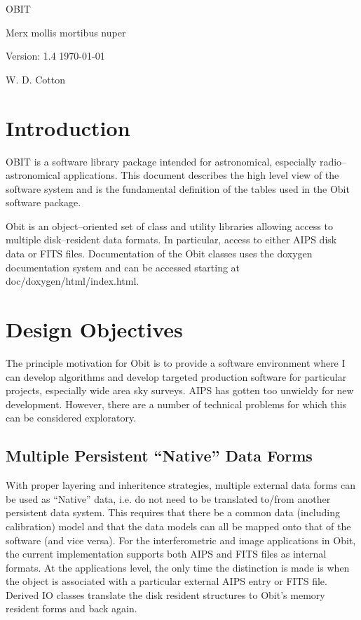 \documentclass[11pt]{article}
\begin{document}
\setcounter{section}{0}

\vskip 5cm
\centerline{\ttlfont OBIT }
\vskip 1cm
\centerline{\ttlfont Merx mollis mortibus nuper}
\vskip 3cm
\centerline{\secfont Version: 1.4 \today}
\vskip 1cm
\centerline{\secfont W. D. Cotton}
\clearpage

\tableofcontents
\cleardoublepage

\section {Introduction}
OBIT is a software library package intended for astronomical,
especially radio--astronomical applications. 
This document describes the high level view of the software system and
is the fundamental definition of the tables  used in the Obit software
package.  

Obit is an object--oriented set of class and utility libraries
allowing access to multiple disk--resident data formats.
In particular, access to either AIPS disk data or FITS files.
Documentation of the Obit classes uses the doxygen documentation
system and can be accessed starting at doc/doxygen/html/index.html.

\section {Design Objectives}
The principle motivation for Obit is to provide a software environment
where I can develop algorithms and develop targeted production
software for particular projects, especially wide area sky surveys.
AIPS has gotten too unwieldy for new development.
However, there are a number of technical problems for which this can be
considered exploratory.

\subsection{Multiple Persistent ``Native'' Data Forms}
With proper layering and inheritence strategies, multiple external data
forms can be used as ``Native'' data, i.e. do not need to be
translated to/from another persistent data system.
This requires that there be a common data (including calibration)
model and that the data models can all be mapped onto that of the
software (and vice versa).
For the interferometric and image applications in Obit, the current
implementation supports both AIPS and FITS files as internal formats.
At the applications level, the only time the distinction is made is
when the object is associated with a particular external AIPS entry or
FITS file.
Derived IO classes translate the disk resident structures to Obit's
memory resident forms and back again.
\end{document}
